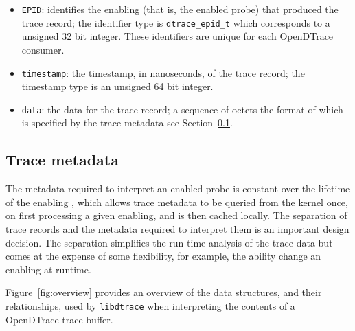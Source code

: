 \begin{itemize}
\item{\texttt{EPID}}: identifies the enabling (that is, the enabled
  probe) that produced the trace record; the identifier type is
  \texttt{dtrace\_epid\_t} which corresponds to a unsigned 32 bit
  integer.  These identifiers are unique for each OpenDTrace consumer.

\item{\texttt{timestamp}:} the timestamp, in nanoseconds, of the trace
  record; the timestamp type is an unsigned 64 bit integer.

\item{\texttt{data}:} the data for the trace record; a sequence of
  octets the format of which is specified by the trace metadata see
  Section~\ref{subsec:probe_data_structures}.
\end{itemize}

\subsection{Trace metadata}
\label{subsec:probe_data_structures}

The metadata required to interpret an enabled probe is constant over
the lifetime of the enabling \cite{DTrace2004}, which allows trace
metadata to be queried from the kernel once, on first processing a
given enabling, and is then cached locally.  The separation of trace
records and the metadata required to interpret them is an important
design decision.  The separation simplifies the run-time analysis of
the trace data but comes at the expense of some flexibility, for
example, the ability change an enabling at runtime.


Figure~\ref{fig:overview} provides an overview of the data structures,
and their relationships, used by \texttt{libdtrace} when interpreting
the contents of a OpenDTrace trace buffer.


